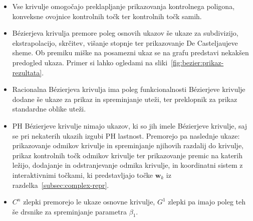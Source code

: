 \documentclass[isrm2, tisk]{fmfdelo}
\begin{document}
    \begin{itemize}
        \item  Vse krivulje omogočajo preklapljanje prikazovanja kontrolnega poligona, konveksne ovojnice kontrolnih točk ter kontrolnih točk samih.
        \item  Bézierjeva krivulja premore poleg osnovih ukazov še ukaze za subdivizijo, ekstrapolacijo, skrčitev, višanje stopnje ter prikazovanje De Casteljaujeve sheme.
        Ob premiku miške na posamezni ukaz se na grafu predstavi nekakšen predogled ukaza.
        Primer si lahko ogledami na sliki~\ref{fig:bezier:prikaz-rezultata}.
        \item Racionalna Bézierjeva krivulja ima poleg funkcionalnosti Bézierjeve krivulje dodane še ukaze za prikaz in spreminjanje uteži, ter preklopnik za prikaz standardne oblike uteži.
        \item PH Bézierjeve krivulje nimajo ukazov, ki so jih imele Bézierjeve krivulje, saj se pri nekaterih ukazih izgubi PH lastnost.
        Premorejo pa naslednje ukaze: prikazovanje odmikov krivulje in spreminjanje njihovih razdalij do krivulje,
        prikaz kontrolnih točk odmikov krivulje ter prikazovanje premic na katerih ležijo, dodajanje in odstranjevanje odmika krivulje, in koordinatni sistem z interaktivnimi točkami, ki predstavljajo točke $\mathbf{w}_k$ iz razdelka~\ref{subsec:complex-repr}.
        \item $C^n$ zlepki premorejo le ukaze osnovne krivulje, $G^1$ zlepki pa imajo poleg teh še drsnike za spreminjanje parametra $\beta_1$.
    \end{itemize}
\end{document}
